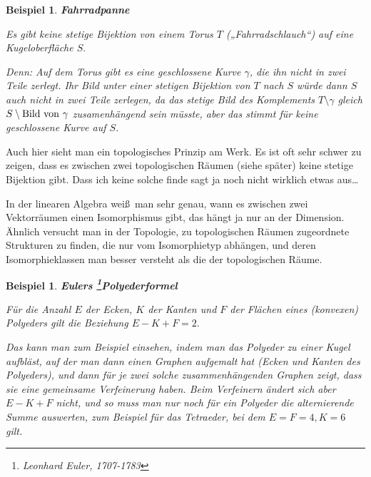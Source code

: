 \documentclass[12pt]{scrbook}   %
\newtheorem{bspX}[alles]{Beispiel}
\newenvironment{bsp}[1]{\begin{bspX}{\bf #1}\par\rm}{\end{bspX}}
\begin{document}
\begin{bsp}{\bf Fahrradpanne}

{\rm Es gibt keine stetige Bijektion von einem Torus $T$ 
(„Fahrradschlauch“) auf eine Kugeloberfläche $S.$ 


Denn:  Auf dem Torus gibt es eine geschlossene Kurve $\gamma$, die ihn nicht 
in zwei 
Teile zerlegt. Ihr Bild unter einer stetigen Bijektion von $T$ nach $S$ 
würde dann $S$ auch nicht in zwei Teile zerlegen, da das stetige Bild des
Komplements $T\setminus \gamma$ gleich 
$S\setminus{\rm Bild\ von\ }\gamma$ zusamenhängend sein müsste, aber
das stimmt für keine geschlossene Kurve auf $S$.}
\end{bsp}

Auch hier sieht man ein topologisches Prinzip am Werk. Es ist oft sehr schwer
zu zeigen, dass es zwischen zwei topologischen Räumen (siehe später) keine
stetige Bijektion gibt. Dass ich keine solche finde sagt ja noch nicht wirklich
etwas aus\dots

In der linearen Algebra wei\ss\  man sehr genau, wann es 
zwischen zwei Vektorräumen einen Isomorphismus gibt, das hängt ja nur an 
der Dimension. Ähnlich versucht man in der Topologie, zu topologischen 
Räumen zugeordnete Strukturen zu finden, die nur vom Isomorphietyp 
abhängen, und deren Isomorphieklassen man besser versteht als die der 
topologischen Räume.

\begin{bsp} {\bf Eulers \footnote{Leonhard Euler, 1707-1783}Polyederformel}

{\rm Für die Anzahl $E$ der Ecken, $K$ der Kanten und $F$ der Flächen eines
(konvexen) Polyeders gilt die Beziehung $E-K+F=2.$

Das kann man zum Beispiel einsehen, indem man das Polyeder zu einer Kugel 
aufbläst, auf der man dann einen Graphen aufgemalt hat (Ecken und Kanten des 
Polyeders), und dann für je zwei solche zusammenhängenden Graphen zeigt, 
dass sie eine gemeinsame Verfeinerung haben. Beim Verfeinern ändert sich
aber $E-K+F$ nicht, und so muss man nur noch für ein Polyeder die 
alternierende Summe auswerten, zum Beispiel für das Tetraeder, bei dem 
$E=F=4, K=6$ gilt.
}
\end{bsp}
\end{document}
